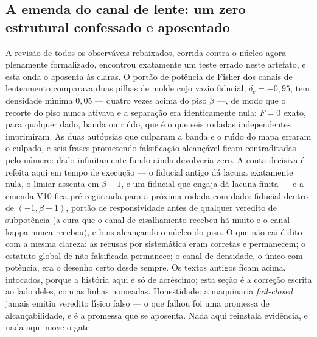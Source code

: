 \documentclass[11pt]{article}
\theoremstyle{definition}\newtheorem{deriv}{Derivação}
\begin{document}
\subsection*{A emenda do canal de lente: um zero estrutural confessado e aposentado}A revis\~ao de todos os observ\'aveis rebaixados, corrida contra o n\'ucleo agora plenamente formalizado, encontrou exatamente um teste errado neste artefato, e esta onda o aposenta \`as claras. O port\~ao de pot\^encia de Fisher dos canais de lenteamento comparava duas pilhas de molde cujo vazio fiducial, $\delta_c=-0{,}95$, tem densidade m\'\i{}nima $0{,}05$ --- quatro vezes acima do piso $\beta$ ---, de modo que o recorte do piso nunca ativava e a separa\c{c}\~ao era identicamente nula: $F=0$ exato, para qualquer dado, banda ou ru\'\i{}do, que \'e o que seis rodadas independentes imprimiram. As duas aut\'opsias que culparam a banda e o ru\'\i{}do do mapa erraram o culpado, e seis frases prometendo falsifica\c{c}\~ao alcan\c{c}\'avel ficam contraditadas pelo n\'umero: dado infinitamente fundo ainda devolveria zero. A conta decisiva \'e refeita aqui em tempo de execu\c{c}\~ao --- o fiducial antigo d\'a lacuna exatamente nula, o limiar assenta em $\beta-1$, e um fiducial que engaja d\'a lacuna finita --- e a emenda V10 fica pr\'e-registrada para a pr\'oxima rodada com dado: fiducial dentro de $(-1,\beta-1)$, port\~ao de responsividade antes de qualquer veredito de subpot\^encia (a cura que o canal de cisalhamento recebeu h\'a muito e o canal kappa nunca recebeu), e bins alcan\c{c}ando o n\'ucleo do piso. O que n\~ao cai \'e dito com a mesma clareza: as recusas por sistem\'atica eram corretas e permanecem; o estatuto global de n\~ao-falsificada permanece; o canal de densidade, o \'unico com pot\^encia, era o desenho certo desde sempre. Os textos antigos ficam acima, intocados, porque a hist\'oria aqui \'e s\'o de acr\'escimo; esta se\c{c}\~ao \'e a corre\c{c}\~ao escrita ao lado deles, com as linhas nomeadas. Honestidade: a maquinaria \emph{fail-closed} jamais emitiu veredito f\'\i{}sico falso --- o que falhou foi uma promessa de alcan\c{c}abilidade, e \'e a promessa que se aposenta. Nada aqui reinstala evid\^encia, e nada aqui move o gate.
\end{document}
